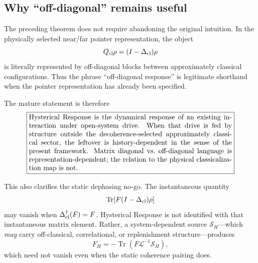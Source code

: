 \documentclass[11pt]{article}
\theoremstyle{definition}
\theoremstyle{remark}
\newcommand{\Tr}{\operatorname{Tr}}
\begin{document}
\subsection{Why ``off-diagonal'' remains useful}
The preceding theorem does not require abandoning the original intuition. In the physically selected near/far pointer representation, the object
\begin{equation}
 Q_{\rm cl}\rho=(I-\Delta_{\rm cl})\rho
\end{equation}
is literally represented by off-diagonal blocks between approximately classical configurations. Thus the phrase ``off-diagonal response'' is legitimate shorthand when the pointer representation has already been specified.

The mature statement is therefore
\begin{equation}
 \boxed{
 \begin{minipage}{0.84\linewidth}
 Hysterical Response is the dynamical response of an existing interaction under open-system drive.
 When that drive is fed by structure outside the decoherence-selected approximately classical sector, the leftover is history-dependent in the sense of the present framework.
 Matrix diagonal vs.\ off-diagonal language is representation-dependent; the relation to the physical classicalization map is not.
 \end{minipage}}
 \label{eq:mature}
\end{equation}

This also clarifies the static dephasing no-go. The instantaneous quantity
\begin{equation}
 \Tr[F(I-\Delta_{\rm cl})\rho]
\end{equation}
may vanish when $\Delta_{\rm cl}^\dagger(F)=F$. Hysterical Response is not identified with that instantaneous matrix element. Rather, a system-dependent source $\mathcal S_H$---which \emph{may} carry off-classical, correlational, or replenishment structure---produces
\begin{equation}
 F_H=-\Tr(F\mathcal L^{-1}\mathcal S_H),
\end{equation}
which need not vanish even when the static coherence pairing does.
\end{document}
